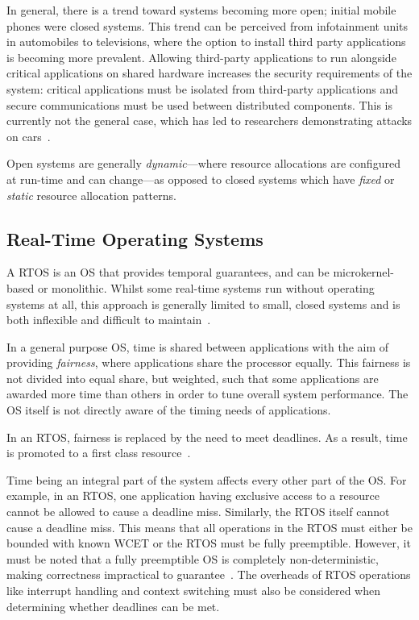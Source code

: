 In general, there is a trend toward systems becoming more open; initial mobile phones were closed
systems.  This trend can be perceived from infotainment units in automobiles to televisions, where
the option to install third party applications is becoming more prevalent.  Allowing third-party
applications to run alongside critical applications on shared hardware increases the security
requirements of the system: critical applications must be isolated from third-party applications and
secure communications must be used between distributed components.  This is currently not the
general case, which has led to researchers demonstrating attacks on
cars~\citep{Checkoway_MKASSKCRK_11}.

Open systems are generally \emph{dynamic}---where resource allocations are configured at run-time
and can change---as opposed to closed systems which have \emph{fixed} or \emph{static} resource
allocation patterns.

\subsection{Real-Time Operating Systems}

A \gls{RTOS} is an \gls{OS} that provides temporal guarantees, and can be microkernel-based or
monolithic.  Whilst some real-time systems run without operating systems at all, this approach is
generally limited to small, closed systems and is both inflexible and difficult to
maintain~\citep{Lui_AACBBBCLM_04}.

In a general purpose \gls{OS}, time is shared between applications with the aim of providing
\emph{fairness}, where applications share the processor equally.  This fairness is not divided into
equal share, but weighted, such that some applications are awarded more time than others in order
to tune overall system performance.  The \gls{OS} itself is not directly aware of the timing needs of
applications.

In an \gls{RTOS}, fairness is replaced by the need to meet deadlines. As a result, time is promoted
to a first class resource~\citep{Stankovic_88}.

Time being an integral part of the system affects every other part of the \gls{OS}.  For example, in
an \gls{RTOS}, one application having exclusive access to a resource cannot be allowed to cause a
deadline miss.  Similarly, the \gls{RTOS} itself cannot cause a deadline miss.  This means that all
operations in the \gls{RTOS} must either be bounded with known {\gls{WCET}} or the \gls{RTOS} must
be fully preemptible.  However, it must be noted that a fully preemptible \gls{OS} is completely
non-deterministic, making correctness impractical to guarantee~\citep{Blackham_TH_12}.  The overheads
of \gls{RTOS} operations like interrupt handling and context switching must also be considered when
determining whether deadlines can be met.

